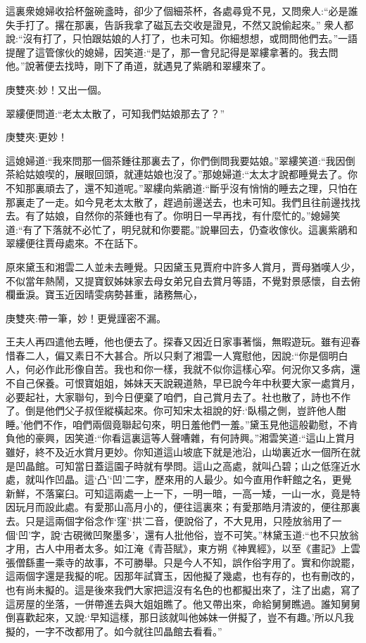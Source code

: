 \begin{parag}
    這裏衆媳婦收拾杯盤碗盞時，卻少了個細茶杯，各處尋覓不見，又問衆人:“必是誰失手打了。撂在那裏，告訴我拿了磁瓦去交收是證見，不然又說偷起來。” 衆人都說:“沒有打了，只怕跟姑娘的人打了，也未可知。你細想想，或問問他們去。”一語提醒了這管傢伙的媳婦，因笑道:“是了，那一會兒記得是翠縷拿著的。我去問他。”說著便去找時，剛下了甬道，就遇見了紫鵑和翠縷來了。\begin{note}庚雙夾:妙！又出一個。\end{note}翠縷便問道:“老太太散了，可知我們姑娘那去了？”\begin{note}庚雙夾:更妙！\end{note}這媳婦道:“我來問那一個茶鍾往那裏去了，你們倒問我要姑娘。”翠縷笑道:“我因倒茶給姑娘喫的，展眼回頭，就連姑娘也沒了。”那媳婦道:“太太才說都睡覺去了。你不知那裏頑去了，還不知道呢。”翠縷向紫鵑道:“斷乎沒有悄悄的睡去之理，只怕在那裏走了一走。如今見老太太散了，趕過前邊送去，也未可知。我們且往前邊找找去。有了姑娘，自然你的茶鍾也有了。你明日一早再找，有什麼忙的。”媳婦笑道:“有了下落就不必忙了，明兒就和你要罷。”說畢回去，仍查收傢伙。這裏紫鵑和翠縷便往賈母處來。不在話下。
\end{parag}


\begin{parag}
    原來黛玉和湘雲二人並未去睡覺。只因黛玉見賈府中許多人賞月，賈母猶嘆人少，不似當年熱鬧，又提寶釵姊妹家去母女弟兄自去賞月等語，不覺對景感懷，自去俯欄垂淚。寶玉近因晴雯病勢甚重，諸務無心，\begin{note}庚雙夾:帶一筆，妙！更覺謹密不漏。\end{note}王夫人再四遣他去睡，他也便去了。探春又因近日家事著惱，無暇遊玩。雖有迎春惜春二人，偏又素日不大甚合。所以只剩了湘雲一人寬慰他，因說:“你是個明白人，何必作此形像自苦。我也和你一樣，我就不似你這樣心窄。何況你又多病，還不自己保養。可恨寶姐姐，姊妹天天說親道熱，早已說今年中秋要大家一處賞月，必要起社，大家聯句，到今日便棄了咱們，自己賞月去了。社也散了，詩也不作了。倒是他們父子叔侄縱橫起來。你可知宋太祖說的好:‘臥榻之側，豈許他人酣睡。’他們不作，咱們兩個竟聯起句來，明日羞他們一羞。”黛玉見他這般勸慰，不肯負他的豪興，因笑道:“你看這裏這等人聲嘈雜，有何詩興。”湘雲笑道:“這山上賞月雖好，終不及近水賞月更妙。你知道這山坡底下就是池沿，山坳裏近水一個所在就是凹晶館。可知當日蓋這園子時就有學問。這山之高處，就叫凸碧；山之低窪近水處，就叫作凹晶。這‘凸’‘凹’二字，歷來用的人最少。如今直用作軒館之名，更覺新鮮，不落窠臼。可知這兩處一上一下，一明一暗，一高一矮，一山一水，竟是特因玩月而設此處。有愛那山高月小的，便往這裏來；有愛那皓月清波的，便往那裏去。只是這兩個字俗念作‘窪’‘拱’二音，便說俗了，不大見用，只陸放翁用了一個‘凹’字，說‘古硯微凹聚墨多’，還有人批他俗，豈不可笑。”林黛玉道:“也不只放翁才用，古人中用者太多。如江淹《青苔賦》，東方朔《神異經》，以至《畫記》上雲張僧繇畫一乘寺的故事，不可勝舉。只是今人不知，誤作俗字用了。實和你說罷，這兩個字還是我擬的呢。因那年試寶玉，因他擬了幾處，也有存的，也有刪改的，也有尚未擬的。這是後來我們大家把這沒有名色的也都擬出來了，注了出處，寫了這房屋的坐落，一併帶進去與大姐姐瞧了。他又帶出來，命給舅舅瞧過。誰知舅舅倒喜歡起來，又說:‘早知這樣，那日該就叫他姊妹一併擬了，豈不有趣。’所以凡我擬的，一字不改都用了。如今就往凹晶館去看看。”
\end{parag}


